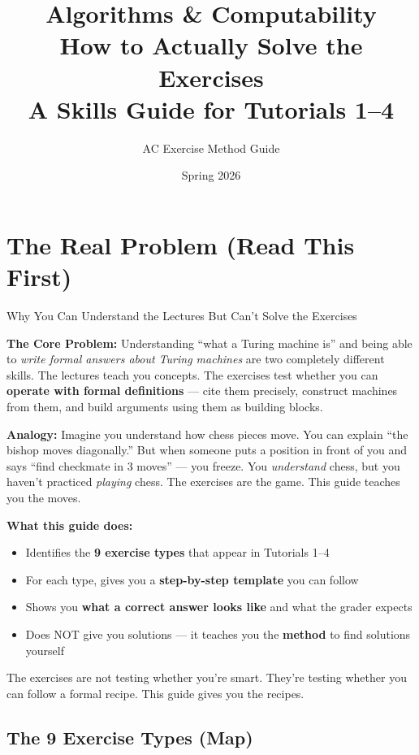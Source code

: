 \documentclass[11pt,a4paper]{article}
\title{\Huge\textbf{Algorithms \& Computability}\\[0.5em]
\LARGE How to Actually Solve the Exercises\\[0.3em]
\large A Skills Guide for Tutorials 1--4}
\author{AC Exercise Method Guide}
\date{Spring 2026}
\newcommand{\keytakeaway}[1]{%
  \par\vspace{0.3em}%
  \colorbox{yellow!60}{\parbox{\dimexpr\linewidth-2\fboxsep}{#1}}%
  \vspace{0.3em}}
\begin{document}
\maketitle
\tableofcontents
\newpage

\section{The Real Problem (Read This First)}

\begin{conceptbox}{Why You Can Understand the Lectures But Can't Solve the Exercises}

\textbf{The Core Problem:} Understanding ``what a Turing machine is'' and being able to \emph{write formal answers about Turing machines} are two completely different skills. The lectures teach you concepts. The exercises test whether you can \textbf{operate with formal definitions} --- cite them precisely, construct machines from them, and build arguments using them as building blocks.

\textbf{Analogy:} Imagine you understand how chess pieces move. You can explain ``the bishop moves diagonally.'' But when someone puts a position in front of you and says ``find checkmate in 3 moves'' --- you freeze. You \emph{understand} chess, but you haven't practiced \emph{playing} chess. The exercises are the game. This guide teaches you the moves.

\textbf{What this guide does:}
\begin{itemize}
    \item Identifies the \textbf{9 exercise types} that appear in Tutorials 1--4
    \item For each type, gives you a \textbf{step-by-step template} you can follow
    \item Shows you \textbf{what a correct answer looks like} and what the grader expects
    \item Does NOT give you solutions --- it teaches you the \textbf{method} to find solutions yourself
\end{itemize}

\keytakeaway{The exercises are not testing whether you're smart. They're testing whether you can follow a formal recipe. This guide gives you the recipes.}
\end{conceptbox}

\subsection{The 9 Exercise Types (Map)}
\end{document}
